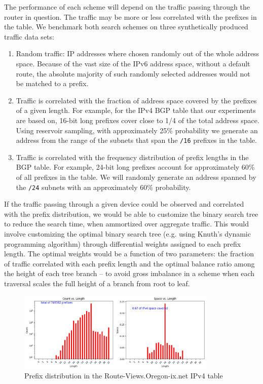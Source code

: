 \documentclass[conference,compsoc]{IEEEtran}
\begin{document}
The performance of each scheme will depend on the traffic passing
through the router in question. The traffic may be more or less correlated
with the prefixes in the table. We benchmark both search schemes on three
synthetically produced traffic data sets:

\begin{enumerate}
\item Random traffic: IP addresses where chosen randomly out of the whole
        address space. Because of the vast size of the IPv6 address space,
        without a default route, the absolute majority of such randomly 
        selected addresses would not be matched to a prefix.
\item Traffic is correlated with the fraction of address space covered by
  the prefixes of a given length. For example, for the IPv4 BGP table that 
    our experiments are based on, 16-bit long prefixes cover close to 1/4
    of the total address space. Using reservoir sampling, with approximately
    25\% probability we generate an
    address from the range of the subnets that span the \texttt{/16} prefixes
    in the table.
\item Traffic is correlated with the frequency distribution of prefix
    lengths in the BGP table. For example, 24-bit long prefixes account
    for approximately 60\% of all prefixes in the table. We will randomly
    generate an address spanned by the \texttt{/24} subnets with an
    approximately 60\% probability.
\end{enumerate}

If the traffic passing through a given device could be observed and correlated
with the prefix distribution, we would be able to customize the binary
search tree to reduce the search time, when ammortized over aggregate traffic.
This would involve customizing the optimal binary search tree (e.g. using
Knuth's dynamic programming algorithm) through differential weights
assigned to each prefix length. The
optimal weights would be a function of two parameters:
the fraction of traffic correlated with each prefix length and the 
optimal balance ratio among the height of each tree branch --
to avoid gross imbalance in a scheme when each traversal scales the full
height of a branch from root to leaf.

\begin{figure}[h]
\centering
\includegraphics[height=1.5in]{../img/prefix_distribution_v4.png}
  \caption{Prefix distribution in the Route-Views.Oregon-ix.net IPv4 table}
\label{fig:prefixes-v4}
\end{figure}
\end{document}
